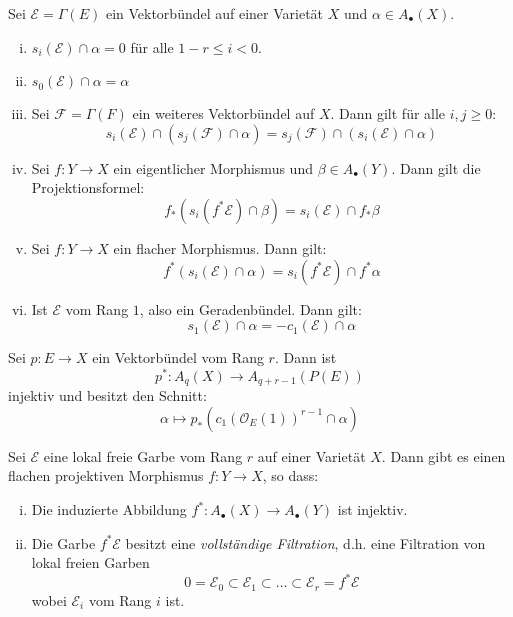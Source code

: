 \documentclass[10pt,a4paper]{article}
\begin{document}
\begin{proposition}
Sei $\mathcal{E} = \Gamma(E)$ ein Vektorbündel auf einer Varietät $X$ und $\alpha\in A_\bullet(X)$.
\begin{enumerate}[(i)]
\item $s_i(\mathcal{E})\cap\alpha = 0$ für alle $1-r\leq i <0$.
\item $s_0(\mathcal{E})\cap\alpha = \alpha$
\item Sei $\mathcal{F} = \Gamma(F)$ ein weiteres Vektorbündel auf $X$. Dann gilt für alle $i,j\geq 0$:
\[ s_i(\mathcal{E})\cap (s_j(\mathcal{F}) \cap \alpha) = s_j(\mathcal{F}) \cap (s_i(\mathcal{E})\cap \alpha) \]
\item Sei $f:Y\to X$ ein eigentlicher Morphismus und $\beta\in A_\bullet(Y)$. Dann gilt die Projektionsformel:
\[ f_\ast(s_i(f^\ast\mathcal{E})\cap\beta) = s_i(\mathcal{E})\cap f_\ast\beta \]
\item Sei $f:Y\to X$ ein flacher Morphismus. Dann gilt:
\[ f^\ast(s_i(\mathcal{E})\cap \alpha) = s_i(f^\ast\mathcal{E})\cap f^\ast\alpha \]
\item Ist $\mathcal{E}$ vom Rang $1$, also ein Geradenbündel. Dann gilt:
\[ s_1(\mathcal{E}) \cap\alpha = -c_1(\mathcal{E})\cap \alpha \]
\end{enumerate}
\end{proposition}

\begin{corollary}
Sei $p:E\to X$ ein Vektorbündel vom Rang $r$. Dann ist
\[ p^\ast: A_q(X)\to A_{q+r-1}(P(E)) \]
injektiv und besitzt den Schnitt:
\[ \alpha\mapsto p_\ast(c_1(\mathcal{O}_E(1))^{r-1}\cap\alpha) \]
\end{corollary}

\begin{corollary}
Sei $\mathcal{E}$ eine lokal freie Garbe vom Rang $r$ auf einer Varietät $X$. Dann gibt es einen flachen projektiven Morphismus $f:Y\to X$, so dass:
\begin{enumerate}[(i)]
\item Die induzierte Abbildung $f^\ast:A_\bullet(X)\to A_\bullet(Y)$ ist injektiv.
\item Die Garbe $f^\ast\mathcal{E}$ besitzt eine \textit{vollständige Filtration}, d.h. eine Filtration von lokal freien Garben
\[ 0 = \mathcal{E}_0 \subset \mathcal{E}_1 \subset\ldots\subset \mathcal{E}_r = f^\ast\mathcal{E} \]
wobei $\mathcal{E}_i$ vom Rang $i$ ist.
\end{enumerate}
\end{corollary}
\end{document}
